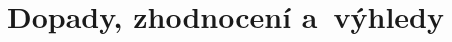 \documentclass{book}
\begin{document}


\part{Dopady, zhodnocení a~výhledy}


\newpage \thispagestyle{empty} \mbox{} \newpage

\newpage \thispagestyle{empty} \mbox{} \newpage

\newpage \thispagestyle{empty} \mbox{} \newpage





%
% 



\printbibliography
\tableofcontents
\end{document}
